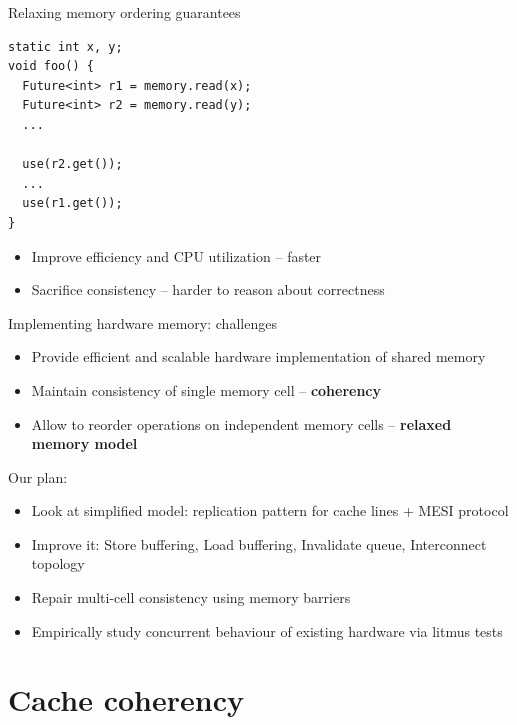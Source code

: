 \begin{frame}{Relaxing memory ordering guarantees}

\begin{verbatim}
static int x, y;
void foo() {
  Future<int> r1 = memory.read(x);
  Future<int> r2 = memory.read(y);
  ...

  use(r2.get());
  ...
  use(r1.get());
}
\end{verbatim}

\begin{itemize}
    \item Improve efficiency and CPU utilization -- faster
    \item Sacrifice consistency -- harder to reason about correctness
\end{itemize}

\end{frame}


\begin{frame}{Implementing hardware memory: challenges}

\begin{itemize}
    \item Provide efficient and scalable hardware implementation of shared memory
    \pause
    \item Maintain consistency of single memory cell -- \textbf{coherency}
    \pause
    \item Allow to reorder operations on independent memory cells -- \textbf{relaxed memory model}
\end{itemize}

\pause
Our plan:
\begin{itemize}
    \pause
    \item Look at simplified model: replication pattern for cache lines + MESI protocol
    \pause
    \item Improve it: Store buffering, Load buffering, Invalidate queue, Interconnect topology    
    \pause
    \item Repair multi-cell consistency using memory barriers
    \pause
    \item Empirically study concurrent behaviour of existing hardware via litmus tests
\end{itemize}

\end{frame}

\section{Cache coherency}
\showTOC

